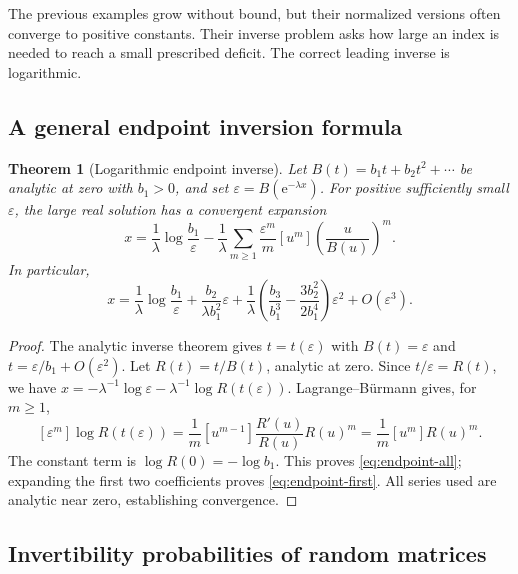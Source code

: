 \documentclass[11pt]{article}
\numberwithin{equation}{section}
\newtheorem{theorem}{Theorem}[section]
\theoremstyle{definition}
\newcommand{\coef}[2]{[#1^{#2}]}
\newcommand{\ee}{\mathrm e}
\newcommand{\eps}{\varepsilon}
\begin{document}
The previous examples grow without bound, but their normalized versions often converge to positive constants. Their inverse problem asks how large an index is needed to reach a small prescribed deficit. The correct leading inverse is logarithmic.

\subsection{A general endpoint inversion formula}

\begin{theorem}[Logarithmic endpoint inverse]\label{thm:endpoint}
Let $B(t)=b_1t+b_2t^2+\cdots$ be analytic at zero with $b_1>0$, and set
$\eps=B(\ee^{-\lambda x})$. For positive sufficiently small $\eps$, the large real solution has a convergent expansion
\begin{equation}\label{eq:endpoint-all}
 \boxed{\displaystyle
 x=\frac1\lambda\log\frac{b_1}{\eps}
 -\frac1\lambda\sum_{m\ge1}\frac{\eps^m}{m}
     \coef{u}{m}\left(\frac{u}{B(u)}\right)^m.}
\end{equation}
In particular,
\begin{equation}\label{eq:endpoint-first}
 x=\frac1\lambda\log\frac{b_1}{\eps}
  +\frac{b_2}{\lambda b_1^2}\eps
  +\frac1\lambda\left(\frac{b_3}{b_1^3}
             -\frac{3b_2^2}{2b_1^4}\right)\eps^2
  +O(\eps^3).
\end{equation}
\end{theorem}
\begin{proof}
The analytic inverse theorem gives $t=t(\eps)$ with $B(t)=\eps$ and
$t=\eps/b_1+O(\eps^2)$. Let $R(t)=t/B(t)$, analytic at zero. Since
$t/\eps=R(t)$, we have
$x=-\lambda^{-1}\log\eps-\lambda^{-1}\log R(t(\eps))$.
Lagrange--B\"urmann gives, for $m\ge1$,
\[
 [\eps^m]\log R(t(\eps))
 =\frac1m[u^{m-1}]\frac{R'(u)}{R(u)}R(u)^m
 =\frac1m[u^m]R(u)^m.
\]
The constant term is $\log R(0)=-\log b_1$. This proves \eqref{eq:endpoint-all}; expanding the first two coefficients proves \eqref{eq:endpoint-first}. All series used are analytic near zero, establishing convergence.
\end{proof}

\subsection{Invertibility probabilities of random matrices}
\end{document}
